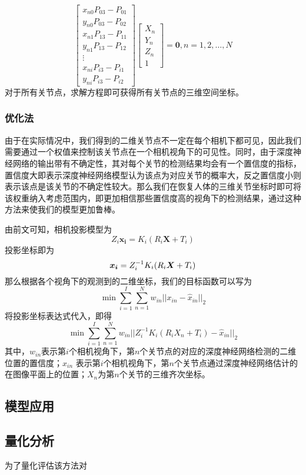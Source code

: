 \begin{equation}
    \left[ \begin{array}{c}
            x_{n0}P_{03} - P_{01} \\
            y_{n0}P_{03} - P_{02} \\
            x_{n1}P_{13} - P_{11} \\
            y_{n1}P_{13} - P_{12} \\
            \vdots                \\
            x_{ni}P_{i3} - P_{i1} \\
            y_{ni}P_{i3} - P_{i2}
        \end{array}\right] \left[ \begin{array}{c}
            X_n \\
            Y_n \\
            Z_n \\
            1
        \end{array}\right]  = \bm{0}, n = 1,2,\ldots,N
\end{equation}
对于所有关节点，求解方程即可获得所有关节点的三维空间坐标。

\subsubsection{优化法}
由于在实际情况中，我们得到的二维关节点不一定在每个相机下都可见，因此我们需要通过一个权值来控制该关节点在一个相机视角下的可见性。同时，由于深度神经网络的输出带有不确定性，其对每个关节的检测结果均会有一个置信度的指标，置信度大即表示深度神经网络模型认为该点为对应关节的概率大，反之置信度小则表示该点是该关节的不确定性较大。那么我们在恢复人体的三维关节坐标时即可将该权重纳入考虑范围内，即更加相信那些置信度高的视角下的检测结果，通过这种方法来使我们的模型更加鲁棒。

由前文可知，相机投影模型为
\begin{equation}
    Z_i \bm{x_i} = K_i(R_i\bm{X} + T_i)
\end{equation}
投影坐标即为
\begin{equation}
    \bm{x_i} = Z_i^{-1}K_i(R_i{\bm{X}} + T_i)
\end{equation}
那么根据各个视角下的观测到的二维坐标，我们的目标函数可以写为
\begin{equation}
    \min \sum^I_{i=1} \sum_{n=1}^N w_{in}||x_{in} - \hat x_{in}||_2
\end{equation}
将投影坐标表达式代入，即得
\begin{equation}
    \min \sum^I_{i=1} \sum_{n=1}^N w_{in}||Z_i^{-1}K_i(R_iX_n + T_i) - \hat x_{in}||_2
\end{equation}
\newcommand{\mi}{第\(i\)个}
\newcommand{\mn}{第\(n\)个}
其中，$w_{in}$表示\mi 相机视角下，\mn 关节点的对应的深度神经网络检测的二维位置的置信度；$\hat x_{in}$ 表示\mi 相机视角下，\mn 关节点通过深度神经网络估计的在图像平面上的位置；$X_n$为\mn 关节的三维齐次坐标。

\subsection{模型应用}

\subsection{量化分析}
为了量化评估该方法对
